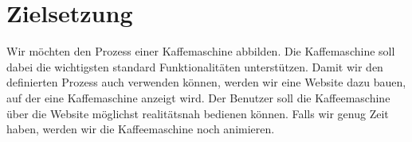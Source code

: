 \chapter{Zielsetzung}\label{ch:zielsetzung}
Wir möchten den Prozess einer Kaffemaschine abbilden.
Die Kaffemaschine soll dabei die wichtigsten standard Funktionalitäten unterstützen.
Damit wir den definierten Prozess auch verwenden können, werden wir eine Website dazu bauen, auf der eine Kaffemaschine anzeigt wird.
Der Benutzer soll die Kaffeemaschine über die Website möglichst realitätsnah bedienen können.
Falls wir genug Zeit haben, werden wir die Kaffeemaschine noch animieren.
